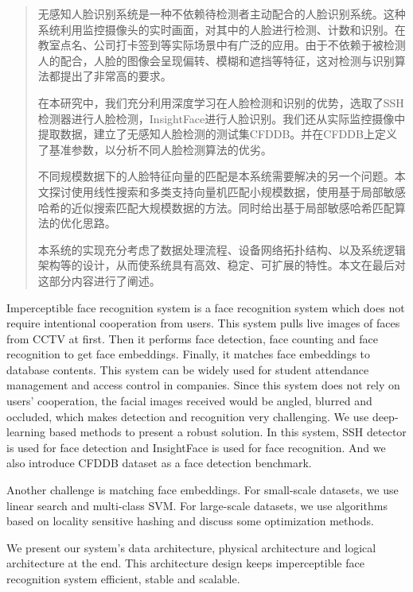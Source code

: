
\begin{abstract}

无感知人脸识别系统是一种不依赖待检测者主动配合的人脸识别系统。这种系统利用监控摄像头的实时画面，对其中的人脸进行检测、计数和识别。在教室点名、公司打卡签到等实际场景中有广泛的应用。由于不依赖于被检测人的配合，人脸的图像会呈现偏转、模糊和遮挡等特征，这对检测与识别算法都提出了非常高的要求。

在本研究中，我们充分利用深度学习在人脸检测和识别的优势，选取了SSH检测器\cite{najibi2017ssh}进行人脸检测，InsightFace\cite{deng2018arcface}进行人脸识别。我们还从实际监控摄像中提取数据，建立了无感知人脸检测的测试集CFDDB。并在CFDDB上定义了基准参数，以分析不同人脸检测算法的优劣。

不同规模数据下的人脸特征向量的匹配是本系统需要解决的另一个问题。本文探讨使用线性搜索和多类支持向量机匹配小规模数据，使用基于局部敏感哈希的近似搜索匹配大规模数据的方法。同时给出基于局部敏感哈希匹配算法的优化思路。

本系统的实现充分考虑了数据处理流程、设备网络拓扑结构、以及系统逻辑架构等的设计，从而使系统具有高效、稳定、可扩展的特性。本文在最后对这部分内容进行了阐述。

\end{abstract}

\begin{englishabstract}

Imperceptible face recognition system is a face recognition system which does not require intentional cooperation from users. This system pulls live images of faces from CCTV at first. Then it performs face detection, face counting and face recognition to get face embeddings. Finally, it matches face embeddings to database contents. This system can be widely used for student attendance management and access control in companies. Since this system does not rely on users’ cooperation, the facial images received would be angled, blurred and occluded, which makes detection and recognition very challenging. We use deep-learning based methods to present a robust solution. In this system, SSH detector\cite{najibi2017ssh} is used for face detection and InsightFace\cite{deng2018arcface} is used for face recognition. And we also introduce CFDDB dataset as a face detection benchmark. 

Another challenge is matching face embeddings. For small-scale datasets, we use linear search and multi-class SVM. For large-scale datasets, we use algorithms based on locality sensitive hashing and discuss some optimization methods.

We present our system’s data architecture, physical architecture and logical architecture at the end. This architecture design keeps imperceptible face recognition system efficient, stable and scalable.

\end{englishabstract}

